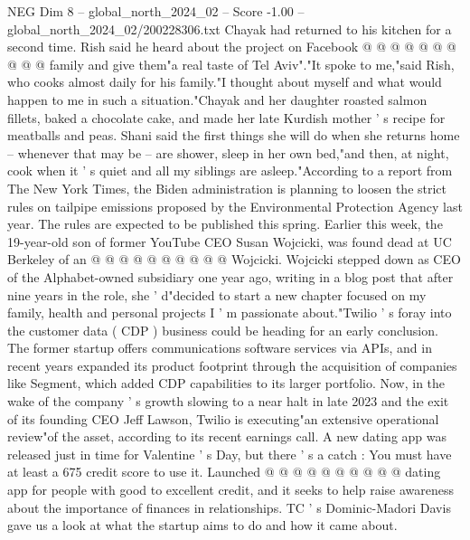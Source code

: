 \begin{textsample}{NEG Dim 8 – global\_north\_2024\_02 – Score -1.00 – global\_north\_2024\_02/200228306.txt}
Chayak had returned to his kitchen for a second time.
Rish said he heard about the project on Facebook @ @ @ @ @ @ @ @ @ @ family and give them"a real taste of Tel Aviv"."It spoke to me,"said Rish, who cooks almost daily for his family."I thought about myself and what would happen to me in such a situation."Chayak and her daughter roasted salmon fillets, baked a chocolate cake, and made her late Kurdish mother ' s recipe for meatballs and peas.
Shani said the first things she will do when she returns home -- whenever that may be -- are shower, sleep in her own bed,"and then, at night, cook when it ' s quiet and all my siblings are asleep."According to a report from The New York Times, the Biden administration is planning to loosen the strict rules on tailpipe emissions proposed by the Environmental Protection Agency last year.
The rules are expected to be published this spring.
Earlier this week, the 19-year-old son of former YouTube CEO Susan Wojcicki, was found dead at UC Berkeley of an @ @ @ @ @ @ @ @ @ @ Wojcicki.
Wojcicki stepped down as CEO of the Alphabet-owned subsidiary one year ago, writing in a blog post that after nine years in the role, she ' d"decided to start a new chapter focused on my family, health and personal projects I ' m passionate about."Twilio ' s foray into the customer data ( CDP ) business could be heading for an early conclusion.
The former startup offers communications software services via APIs, and in recent years expanded its product footprint through the acquisition of companies like Segment, which added CDP capabilities to its larger portfolio.
Now, in the wake of the company ' s growth slowing to a near halt in late 2023 and the exit of its founding CEO Jeff Lawson, Twilio is executing"an extensive operational review"of the asset, according to its recent earnings call.
A new dating app was released just in time for Valentine ' s Day, but there ' s a catch : You must have at least a 675 credit score to use it.
Launched @ @ @ @ @ @ @ @ @ @ dating app for people with good to excellent credit, and it seeks to help raise awareness about the importance of finances in relationships.
TC ' s Dominic-Madori Davis gave us a look at what the startup aims to do and how it came about.

\end{textsample}
